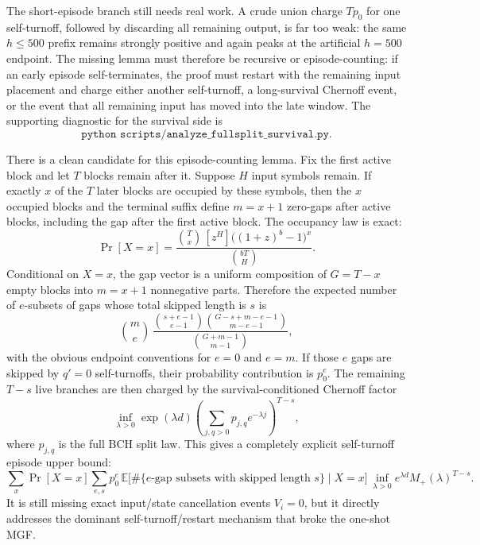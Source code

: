 The short-episode branch still needs real work.  A crude union charge \(T p_0\) for one self-turnoff, followed by
discarding all remaining output, is far too weak: the same \(h\le500\) prefix remains strongly positive and again peaks
at the artificial \(h=500\) endpoint.  The missing lemma must therefore be recursive or episode-counting: if an early
episode self-terminates, the proof must restart with the remaining input placement and charge either another
self-turnoff, a long-survival Chernoff event, or the event that all remaining input has moved into the late window.  The
supporting diagnostic for the survival side is
\[
\texttt{python scripts/analyze\_fullsplit\_survival.py}.
\]

There is a clean candidate for this episode-counting lemma.  Fix the first active block and let \(T\) blocks remain
after it.  Suppose \(H\) input symbols remain.  If exactly \(x\) of the \(T\) later blocks are occupied by these
symbols, then the \(x\) occupied blocks and the terminal suffix define \(m=x+1\) zero-gaps after active blocks,
including the gap after the first active block.  The occupancy law is exact:
\[
\Pr[X=x]
=
\frac{\binom{T}{x}\,[z^H]\big((1+z)^b-1\big)^x}{\binom{bT}{H}}.
\]
Conditional on \(X=x\), the gap vector is a uniform composition of \(G=T-x\) empty blocks into \(m=x+1\) nonnegative
parts.  Therefore the expected number of \(e\)-subsets of gaps whose total skipped length is \(s\) is
\[
\binom{m}{e}\,
\frac{\binom{s+e-1}{e-1}\binom{G-s+m-e-1}{m-e-1}}
{\binom{G+m-1}{m-1}},
\]
with the obvious endpoint conventions for \(e=0\) and \(e=m\).  If those \(e\) gaps are skipped by \(q'=0\)
self-turnoffs, their probability contribution is \(p_0^e\).  The remaining \(T-s\) live branches are then charged by
the survival-conditioned Chernoff factor
\[
\inf_{\lambda>0}\exp(\lambda d)
\left(\sum_{j,q>0}p_{j,q}e^{-\lambda j}\right)^{T-s},
\]
where \(p_{j,q}\) is the full BCH split law.  This gives a completely explicit self-turnoff episode upper bound:
\[
\sum_x \Pr[X=x]\sum_{e,s}
p_0^e\,
\mathbb{E}\big[\#\{e\text{-gap subsets with skipped length }s\}\mid X=x\big]\,
\inf_{\lambda>0}e^{\lambda d}M_+(\lambda)^{T-s}.
\]
It is still missing exact input/state cancellation events \(V_i=0\), but it directly addresses the dominant
self-turnoff/restart mechanism that broke the one-shot MGF.

